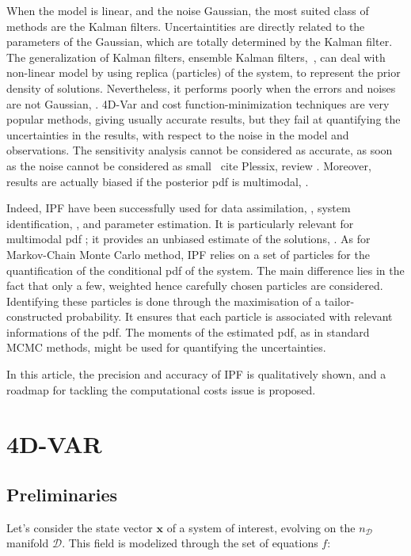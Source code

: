 \documentclass[aip,pof,nofootinbib,reprint,onecolumn]{revtex4-1}
\newcommand{\todo}[1]{{\color{red} #1 }}
\newcommand{\gras}[1]{\boldsymbol{#1}}
\newcommand{\Ephaz}{\mathcal{D}}%
\newcommand{\Nphaz}{n_{\mathcal{D}}} %
\newcommand{\fdyn}{f} %
\newcommand{\point}{\gras{x}} %
\begin{document}
When the model is linear, and the noise Gaussian, the most suited class of methods are the Kalman filters. 
Uncertaintities are directly related to the parameters of the Gaussian, which are totally determined by the Kalman filter. 
The generalization of Kalman filters, ensemble Kalman filters,~\cite{Evensen2009}, can deal with non-linear model by using replica (particles) of the system, to represent the prior density of solutions. 
Nevertheless, it performs poorly when the errors and noises are not Gaussian, \cite{Miller1999}. 
4D-Var and cost function-minimization techniques are very popular methods, giving usually accurate results, but they fail at quantifying the uncertainties in the results, with respect to the noise in the model and observations. 
The sensitivity analysis cannot be considered as accurate, as soon as the noise cannot be considered as small~\todo{cite Plessix, review}.
Moreover, results are actually biased if the posterior pdf is multimodal, \cite{Rabier1992}.

Indeed, IPF have been successfully used for data assimilation, \cite{Chorin2010}, system identification, \cite{Morzfeld2012}, and parameter estimation. 
It is particularly relevant for multimodal pdf ; it provides an unbiased estimate of the solutions, \citep{Atkins2013}.
As for Markov-Chain Monte Carlo method, IPF relies on a set of particles for the quantification of the conditional pdf of the system.
The main difference lies in the fact that only a few, weighted hence carefully chosen particles are considered.  
Identifying these particles is done through the maximisation of a tailor-constructed probability.
It ensures that each particle is associated with relevant informations of the pdf. 
The moments of the estimated pdf, as in standard MCMC methods, might be used for quantifying the uncertainties.

In this article, the precision and accuracy of IPF is qualitatively shown, and a roadmap for tackling the computational costs issue is proposed.

\section{4D-VAR}
\subsection{Preliminaries}
Let's consider the state vector $\point$ of a system of interest, evolving on the $\Nphaz$ manifold $\Ephaz $. This field is modelized through the set of equations $\fdyn$:
\end{document}
